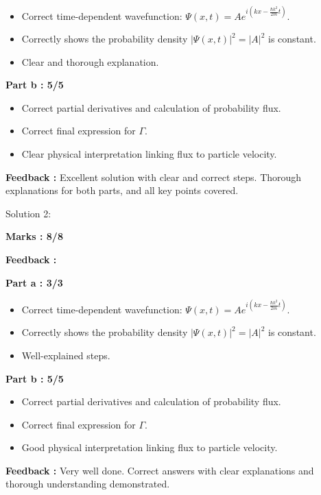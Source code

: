 \documentclass[a4paper,11pt]{article}
\begin{document}
\begin{itemize}
    \item Correct time-dependent wavefunction: $\Psi(x,t) = Ae^{i(kx-\frac{\hbar k^2}{2m}t)}$.
    \item Correctly shows the probability density $|\Psi(x,t)|^2 = |A|^2$ is constant.
    \item Clear and thorough explanation.
\end{itemize}


\textbf{Part b : 5/5}

\begin{itemize}
    \item Correct partial derivatives and calculation of probability flux.
    \item Correct final expression for $\Gamma$.
    \item Clear physical interpretation linking flux to particle velocity.
\end{itemize}


\textbf{Feedback :}
Excellent solution with clear and correct steps. Thorough explanations for both parts, and all key points covered.



Solution 2:

\textbf{Marks : 8/8}

\textbf{Feedback : }

\textbf{Part a : 3/3}

\begin{itemize}
    \item Correct time-dependent wavefunction: $\Psi(x,t) = Ae^{i(kx-\frac{\hbar k^2}{2m}t)}$.
    \item Correctly shows the probability density $|\Psi(x,t)|^2 = |A|^2$ is constant.
    \item Well-explained steps.
\end{itemize}


\textbf{Part b : 5/5}

\begin{itemize}
    \item Correct partial derivatives and calculation of probability flux.
    \item Correct final expression for $\Gamma$.
    \item Good physical interpretation linking flux to particle velocity.
\end{itemize}


\textbf{Feedback :}
Very well done. Correct answers with clear explanations and thorough understanding demonstrated.
\end{document}
